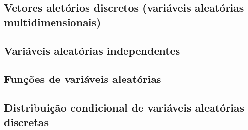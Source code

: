 \documentclass[../Notas.tex]{subfiles}
\begin{document}

\subsection{Vetores aletórios discretos (variáveis aleatórias multidimensionais)}

\subsection{Variáveis aleatórias independentes}

\subsection{Funções de variáveis aleatórias}

\subsection{Distribuição condicional de variáveis aleatórias discretas}
\end{document}
